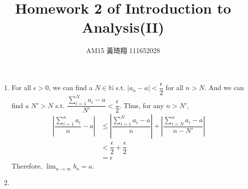 \documentclass[12pt]{article}
\title{Homework 2 of Introduction to Analysis(II)}
\author{AM15 黃琦翔 111652028}
\begin{document}
\maketitle
\begin{enumerate}
    \item For all $\epsilon > 0$, we can find a $N \in \mathbb{N}$ s.t. $|a_n - a| < \dfrac{\epsilon}{2}$ for all $n > N$.
    And we can find a $N' > N$ s.t. $\dfrac{\displaystyle\sum_{i=1}^{N} a_i - a}{N'} < \dfrac{\epsilon}{2}$.
    Thus, for any $n > N'$, \begin{align*}
        |\dfrac{\sum_{i=1}^{n} a_i }{n} - a| &\leq |\dfrac{\sum_{i=1}^{N} a_i - a}{n}| + |\dfrac{\sum_{i=N}^{n} a_i - a}{n - N'}|\\
        &< \dfrac{\epsilon}{2} + \dfrac{\epsilon}{2}\\
        &= \epsilon
    \end{align*}
    Therefore, $\displaystyle\lim_{n\to\infty} b_n = a$.

    \item 
    
\end{enumerate}
\end{document}
